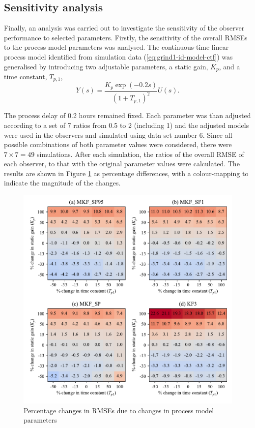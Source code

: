 \subsection{Sensitivity analysis} \label{sec:grind1-sensitivity-analysis}
Finally, an analysis was carried out to investigate the sensitivity of the observer performance to selected parameters. Firstly, the sensitivity of the overall \gls{RMSE}s to the process model parameters was analysed. The continuous-time linear process model identified from simulation data (\ref{eq:grind1-id-model-ctf}) was generalised by introducing two adjustable parameters, a static gain, $K_p$, and a time constant, $T_{p,1}$,
%
%
\begin{equation} \label{eq:grind1-sens-model-ctf}
	Y(s)= \frac{K_p \exp(-0.2s)}{(1 + T_{p,1})^2}U(s).
\end{equation}

The process delay of 0.2 hours remained fixed. Each parameter was than adjusted according to a set of 7 ratios from 0.5 to 2 (including 1) and the adjusted models were used in the observers and simulated using data set number 6. Since all possible combinations of both parameter values were considered, there were $7\times7=49$ simulations. After each simulation, the ratios of the overall \gls{RMSE} of each observer, to that with the original parameter values were calculated. The results are shown in Figure \ref{fig:grind1-obs-sim-sens-model-y-est} as percentage differences, with a colour-mapping to indicate the magnitude of the changes.
\begin{figure}[htp]
	\centering
	\includegraphics[width=15cm]{images/rod_obs_sim_sens_sys_4obs_RMSE_y_est.pdf}
	\caption{Percentage changes in \gls{RMSE}s due to changes in process model parameters}
	\label{fig:grind1-obs-sim-sens-model-y-est}
\end{figure}


